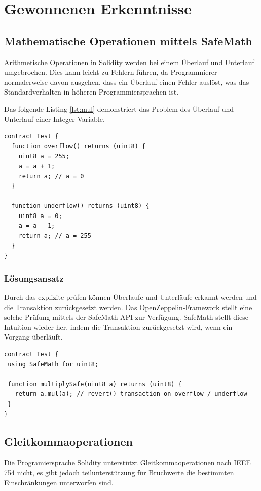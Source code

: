 \section{Gewonnenen Erkenntnisse}


\subsection{Mathematische Operationen mittels SafeMath}
Arithmetische Operationen in Solidity werden bei einem Überlauf und Unterlauf umgebrochen. Dies kann leicht zu Fehlern führen, da Programmierer normalerweise davon ausgehen, dass ein Überlauf einen Fehler auslöst, was das Standardverhalten in höheren Programmiersprachen ist.

Das folgende Listing \ref{lst:mul} demonstriert das Problem des Überlauf und Unterlauf einer Integer Variable.

\begin{lstlisting}[caption={Beispielhafter Überlauf und Unterlauf},captionpos=b,label=lst:mul]
contract Test {
  function overflow() returns (uint8) {
    uint8 a = 255;
    a = a + 1;  	
    return a; // a = 0
  }
  
  function underflow() returns (uint8) {
    uint8 a = 0;
    a = a - 1;  	
    return a; // a = 255
  }
}
\end{lstlisting}

\subsubsection*{Lösungsansatz}
Durch das explizite prüfen können Überlaufe und Unterläufe erkannt werden und die Transaktion zurückgesetzt werden. Das OpenZeppelin-Framework stellt eine solche Prüfung mittels der SafeMath API zur Verfügung. SafeMath stellt diese Intuition wieder her, indem die Transaktion zurückgesetzt wird, wenn ein Vorgang überläuft. \cite{safemath}

\begin{lstlisting}[caption={Beispielhafte Multiplikation mittels SafeMath zurück},captionpos=b,label=lst:mulsafe]
contract Test {
 using SafeMath for uint8;

 function multiplySafe(uint8 a) returns (uint8) {
   return a.mul(a); // revert() transaction on overflow / underflow
 }
}
\end{lstlisting}


\subsection{Gleitkommaoperationen}
Die Programiersprache Solidity unterstützt Gleitkommaoperationen nach IEEE 754 nicht, es gibt jedoch teilunterstützung für Bruchwerte die bestimmten Einschränkungen unterworfen sind.\cite{fixedpointnumbers}

